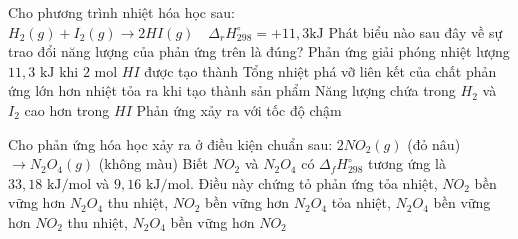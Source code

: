 \documentclass[Main.tex]{subfiles}
\begin{document}
	\begin{ex}
		 Cho phương trình nhiệt hóa học sau:
		$H_2(g) + I_2(g) \longrightarrow 2HI(g) \quad \Delta_r H_{298}^{\circ} = +11{,}3 \text{kJ}$
		Phát biểu nào sau đây về sự trao đổi năng lượng của phản ứng trên là đúng?
		\choice
		{Phản ứng giải phóng nhiệt lượng $11{,}3 \text{ kJ}$ khi $2$ mol $HI$ được tạo thành}
		{Tổng nhiệt phá vỡ liên kết của chất phản ứng lớn hơn nhiệt tỏa ra khi tạo thành sản phẩm}
		{\True Năng lượng chứa trong $H_2$ và $I_2$ cao hơn trong $HI$}
		{Phản ứng xảy ra với tốc độ chậm}
	\end{ex}
	\begin{ex}
		 Cho phản ứng hóa học xảy ra ở điều kiện chuẩn sau:
		$2NO_2(g)$ (đỏ nâu) $\longrightarrow N_2O_4(g)$ (không màu)
		Biết $NO_2$ và $N_2O_4$ có $\Delta_f H_{298}^{\circ}$ tương ứng là $33{,}18 \text{ kJ/mol}$ và $9{,}16 \text{ kJ/mol}$. Điều này chứng tỏ phản ứng
		{tỏa nhiệt, $NO_2$ bền vững hơn $N_2O_4$}
		{thu nhiệt, $NO_2$ bền vững hơn $N_2O_4$}
		{\True tỏa nhiệt, $N_2O_4$ bền vững hơn $NO_2$}
		{thu nhiệt, $N_2O_4$ bền vững hơn $NO_2$}
	\end{ex}
	
\end{document}

